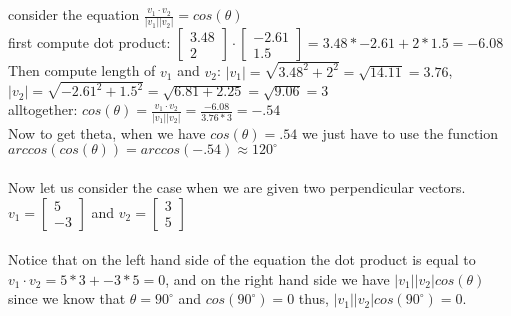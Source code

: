 \documentclass{article}
\begin{document}
consider the equation $\frac{v_1 \cdot v_2}{|v_{1}|| v_{2}|} = cos(\theta)$\\
first compute dot product:
$\begin{bmatrix}
3.48 \\
2
\end{bmatrix} \cdot
\begin{bmatrix}
-2.61 \\
1.5
\end{bmatrix}=3.48*-2.61 + 2*1.5= -6.08$\\
Then compute length of $v_1$ and $v_2$: 
$|v_1|= \sqrt{3.48^2+2^2}=\sqrt{14.11}=3.76$,\\ $|v_2|= \sqrt{-2.61^2+1.5^2}=\sqrt{6.81+2.25}=\sqrt{9.06}=3$\\
alltogether: $cos(\theta) = \frac{v_1 \cdot v_2}{|v_{1}|| v_{2}|}=\frac{-6.08}{3.76*3}=-.54$\\
Now to get theta, when we have $cos(\theta)=.54$ we just have to use the function $arccos(cos(\theta))=arccos(-.54)\approx120^\circ $\\\\
Now let us consider the case when we are given two perpendicular vectors. 
$v_1 = \begin{bmatrix}
5 \\
-3
\end{bmatrix}$ and 
$v_2 = \begin{bmatrix}
3 \\
5
\end{bmatrix}$\\\\
Notice that on the left hand side of the equation the dot product is equal to $v_1 \cdot v_2 = 5*3 + -3*5 = 0$,
and on the right hand side we have $|v_{1}|| v_{2}|cos(\theta)$ since we know that $\theta=90^\circ$ and $cos(90^\circ)=0$
thus, $|v_{1}|| v_{2}|cos(90^\circ)=0$. 
\end{document}
